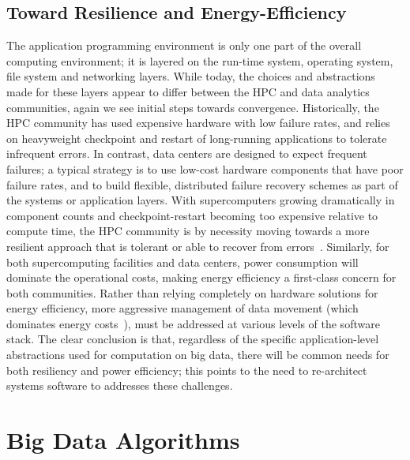 \documentclass{article}
\begin{document}
\subsection*{Toward Resilience and Energy-Efficiency}
The application programming environment is only one part of the overall computing environment; it is layered on the run-time system, operating system, file system and networking layers. While today, the choices and abstractions made for these layers appear to differ between the HPC and data analytics communities, again we see initial steps towards convergence. 
Historically, 
the HPC community has used expensive hardware with low failure rates, and relies on heavyweight checkpoint and restart of long-running applications to tolerate infrequent errors.  In contrast, data centers are designed to expect frequent failures; a typical strategy is to use
low-cost hardware components that have poor failure rates, and to build flexible, distributed failure recovery schemes as part of the systems or application layers.
With supercomputers growing dramatically in component counts and checkpoint-restart becoming too expensive relative to compute time,  the HPC community is by necessity moving towards a more resilient approach that is tolerant or able to recover from errors~\cite{exasys,DOE-exaprog}. 
Similarly, for both supercomputing facilities and data centers, power consumption will dominate the operational costs, making energy efficiency a first-class concern for both communities.
Rather than relying completely on hardware solutions for energy efficiency, more aggressive management of data movement (which dominates energy costs~\cite{exasys}), must be addressed at various levels of the software stack.
The clear conclusion is that, regardless of the specific application-level abstractions used for computation on big data, there will be common needs for both resiliency and power efficiency; this points to the need to re-architect systems software to addresses these challenges.



\section{Big Data Algorithms}
\end{document}
